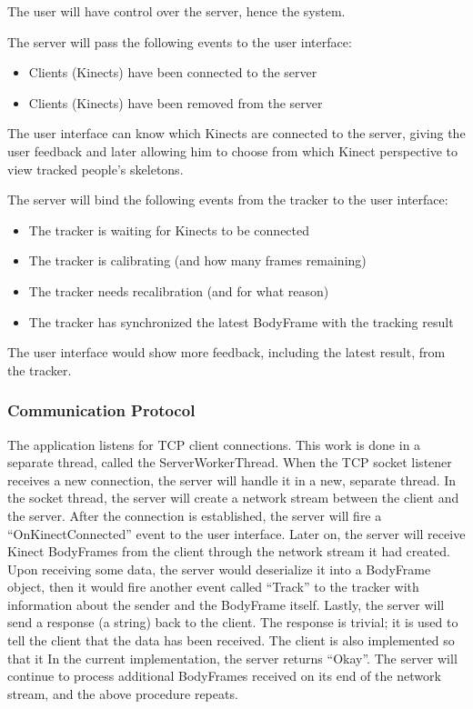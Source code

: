 The user will have control over the server, hence the system.

The server will pass the following events to the user interface:

\begin{itemize}
  \item Clients (Kinects) have been connected to the server
  \item Clients (Kinects) have been removed from the server
\end{itemize}

The user interface can know which Kinects are connected to the server, giving the user feedback and later allowing him to choose from which Kinect perspective to view tracked people's skeletons.

The server will bind the following events from the tracker to the user interface:

\begin{itemize}
  \item The tracker is waiting for Kinects to be connected
  \item The tracker is calibrating (and how many frames remaining)
  \item The tracker needs recalibration (and for what reason)
  \item The tracker has synchronized the latest BodyFrame with the tracking result 
\end{itemize}

The user interface would show more feedback, including the latest result, from the tracker.

\subsubsection{Communication Protocol}

The application listens for TCP client connections. This work is done in a separate thread, called the ServerWorkerThread. When the TCP socket listener receives a new connection, the server will handle it in a new, separate thread. In the socket thread, the server will create a network stream between the client and the server. After the connection is established, the server will fire a ``OnKinectConnected'' event to the user interface. Later on, the server will receive Kinect BodyFrames from the client through the network stream it had created. Upon receiving some data, the server would deserialize it into a BodyFrame object, then it would fire another event called ``Track'' to the tracker with information about the sender and the BodyFrame itself. Lastly, the server will send a response (a string) back to the client. The response is trivial; it is used to tell the client that the data has been received. The client is also implemented so that it In the current implementation, the server returns ``Okay''. The server will continue to process additional BodyFrames received on its end of the network stream, and the above procedure repeats.


